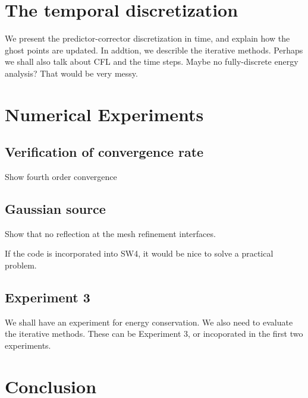 \documentclass[a4paper]{article}
\begin{document}
\section{The temporal discretization}
We present the predictor-corrector discretization in time, and explain how the ghost points are updated. In addtion, we describle the iterative methods. Perhaps we shall also talk about CFL and the time steps. Maybe no fully-discrete energy analysis? That would be very messy. 


\section{Numerical Experiments}

\subsection{Verification of convergence rate}
Show fourth order convergence

\subsection{Gaussian source}
Show that no reflection at the mesh refinement interfaces. 

If the code is incorporated into SW4, it would be nice to solve a practical problem. 

\subsection{Experiment 3}
We shall have an experiment for energy conservation. We also need to evaluate the iterative methods. These can be Experiment 3, or incoporated in the first two experiments.

\section{Conclusion}
\end{document}

